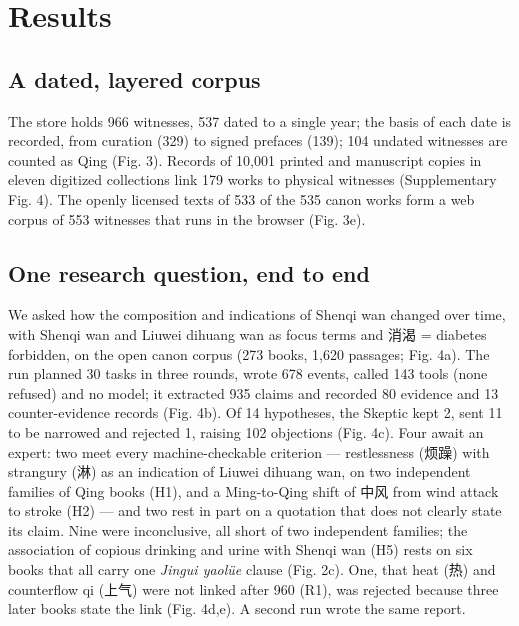 \documentclass[
]{article}
\begin{document}
\hypertarget{results}{%
\section{Results}\label{results}}

\hypertarget{a-dated-layered-corpus}{%
\subsection{A dated, layered corpus}\label{a-dated-layered-corpus}}

The store holds 966 witnesses, 537 dated to a single year; the basis of
each date is recorded, from curation (329) to signed prefaces (139); 104
undated witnesses are counted as Qing (Fig. 3). Records of 10,001
printed and manuscript copies in eleven digitized collections link 179
works to physical witnesses (Supplementary Fig. 4). The openly licensed
texts of 533 of the 535 canon works form a web corpus of 553 witnesses
that runs in the browser (Fig. 3e).

\hypertarget{one-research-question-end-to-end}{%
\subsection{One research question, end to
end}\label{one-research-question-end-to-end}}

We asked how the composition and indications of Shenqi wan changed over
time, with Shenqi wan and Liuwei dihuang wan as focus terms and 消渴 =
diabetes forbidden, on the open canon corpus (273 books, 1,620 passages;
Fig. 4a). The run planned 30 tasks in three rounds, wrote 678 events,
called 143 tools (none refused) and no model; it extracted 935 claims
and recorded 80 evidence and 13 counter-evidence records (Fig. 4b). Of
14 hypotheses, the Skeptic kept 2, sent 11 to be narrowed and rejected
1, raising 102 objections (Fig. 4c). Four await an expert: two meet
every machine-checkable criterion --- restlessness (烦躁) with strangury
(淋) as an indication of Liuwei dihuang wan, on two independent families
of Qing books (H1), and a Ming-to-Qing shift of 中风 from wind attack to
stroke (H2) --- and two rest in part on a quotation that does not
clearly state its claim. Nine were inconclusive, all short of two
independent families; the association of copious drinking and urine with
Shenqi wan (H5) rests on six books that all carry one \emph{Jingui
yaolüe} clause (Fig. 2c). One, that heat (热) and counterflow qi (上气)
were not linked after 960 (R1), was rejected because three later books
state the link (Fig. 4d,e). A second run wrote the same report.
\end{document}
